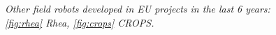 \begin{figure}
	\centering
	\qquad
	\caption{\textit{Other field robots developed in EU projects in the last 6 years: \ref{fig:rhea} Rhea, \ref{fig:crops} CROPS.}}
\end{figure}


